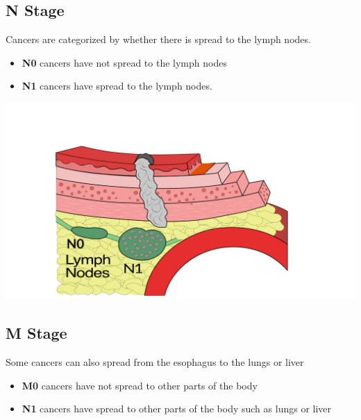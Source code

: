 \documentclass[
  letterpaper,
  DIV=11,
  numbers=noendperiod]{scrartcl}
\providecommand{\tightlist}{%
  \setlength{\itemsep}{0pt}\setlength{\parskip}{0pt}}\usepackage{longtable,booktabs,array}
\begin{document}
\subsection{N Stage}\label{n-stage}

Cancers are categorized by whether there is spread to the lymph nodes.

\begin{itemize}
\tightlist
\item
  \textbf{N0} cancers have not spread to the lymph nodes
\item
  \textbf{N1} cancers have spread to the lymph nodes.
\end{itemize}

\includegraphics{christmas2004_files/mediabag/tumor_t3_nodes_label.png}

\subsection{M Stage}\label{m-stage}

Some cancers can also spread from the esophagus to the lungs or liver

\begin{itemize}
\tightlist
\item
  \textbf{M0} cancers have not spread to other parts of the body
\item
  \textbf{N1} cancers have spread to other parts of the body such as
  lungs or liver
\end{itemize}
\end{document}
